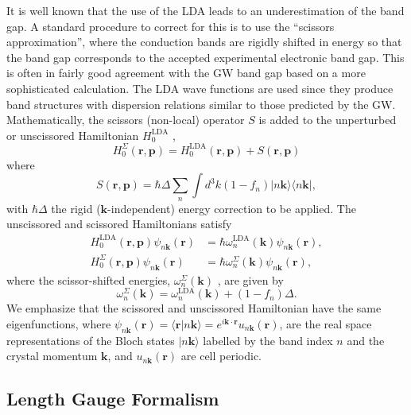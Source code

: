 \documentclass[floatfix,prb,aps,superscriptaddress,showpacs,11pt,preprint,letterpaper]{revtex4}
\begin{document}
It is well known that the use of the LDA
leads to an underestimation of the band gap. A standard
procedure to correct for this is to
use the ``scissors approximation'', where the 
conduction bands are rigidly shifted in energy so that the band gap 
corresponds to the accepted 
experimental electronic band gap.\cite{levinePRL89,levinePRL91,delsolePRB93} 
This is often in fairly good agreement with the GW
band gap based on a more sophisticated calculation.\cite{hybertsenPRB86}
The LDA wave functions are used since they produce band
structures with dispersion relations similar to those predicted by the GW.
Mathematically, the scissors (non-local) operator 
$S$ is added to the unperturbed or unscissored Hamiltonian $H^{\mathrm{LDA}}_{0}$ ,
\begin{equation*}
H^\Sigma_{0}(\mathbf{r},\mathbf{p})=H^{\mathrm{LDA}}_{0}(\mathbf{r},\mathbf{p})+S(\mathbf{r},\mathbf{p})
\end{equation*}
where 
\begin{equation}
S(\mathbf{r},\mathbf{p})=\hbar \Delta\sum_{n}\int d^{3}k(1-f_{n})
|n\mathbf{k}\rangle\langle n\mathbf{k}|,
\label{hats}
\end{equation}
with $\hbar \Delta$  the rigid ($\mathbf{k}$-independent) energy correction to be
applied. 
The unscissored and scissored Hamiltonians satisfy 
\begin{align*}
H^{\mathrm{LDA}}_{0}(\mathbf{r},\mathbf{p})\psi _{n\mathbf{k}}(\mathbf{r}) &=
\hbar \omega^{\mathrm{LDA}}_{n}(\mathbf{k})\psi _{n\mathbf{k}}(\mathbf{r}),\label{hamils} \\
H_{0}^\Sigma (\mathbf{r},\mathbf{p})\psi _{n\mathbf{k}}(\mathbf{r}) &=
\hbar \omega_{n}^\Sigma(\mathbf{k})\psi _{n\mathbf{k}}(\mathbf{r}),
\end{align*}
where the scissor-shifted energies, 
$\omega_{n}^\Sigma(\mathbf{k})$ , are given by
\begin{equation*}
\omega_{n}^\Sigma(\mathbf{k})=\omega^\mathrm{LDA}_{n}(\mathbf{k})+(1-f_{n})\Delta.
\end{equation*}
We emphasize that the scissored and unscissored Hamiltonian 
have the same eigenfunctions, where
$\psi_{n\mathbf{k}}(\mathbf{r})=\langle\mathbf{r}|n\mathbf{k}\rangle=e^{i\mathbf{k}\cdot\mathbf{r}}u_{n\mathbf{k}}(\mathbf{r})$,
are the real space representations of the Bloch states $| n\mathbf{k}\rangle$ labelled 
by the band index $n$ and the crystal momentum $\mathbf{k}$, and $u_{n\mathbf{k}}(\mathbf{r})$
are cell periodic. 

\subsection{Length Gauge Formalism}\label{lgf}
\end{document}
